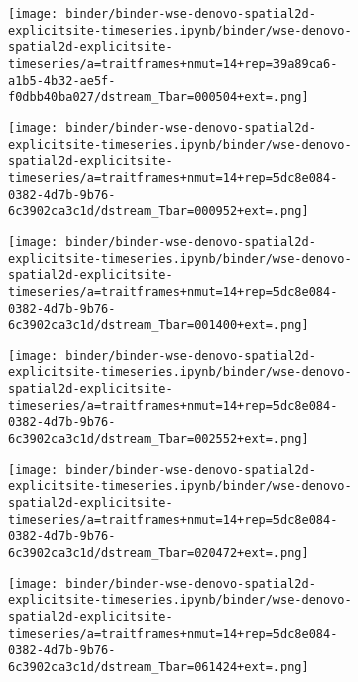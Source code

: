 \begin{figure}[ht]
  \centering
  \begin{subfigure}[t]{\textwidth}
    \centering
    \begin{minipage}[b]{0.04\textwidth}
      \caption{}
      \label{fig:dynamics:no-fixation}
    \end{minipage}
    \begin{minipage}[b]{0.15\textwidth}
      \texttt{[image: binder/binder-wse-denovo-spatial2d-explicitsite-timeseries.ipynb/binder/wse-denovo-spatial2d-explicitsite-timeseries/a=traitframes+nmut=14+rep=39a89ca6-a1b5-4b32-ae5f-f0dbb40ba027/dstream\_Tbar=000504+ext=.png]}
    \end{minipage}
    \begin{minipage}[b]{0.15\textwidth}
      \texttt{[image: binder/binder-wse-denovo-spatial2d-explicitsite-timeseries.ipynb/binder/wse-denovo-spatial2d-explicitsite-timeseries/a=traitframes+nmut=14+rep=5dc8e084-0382-4d7b-9b76-6c3902ca3c1d/dstream\_Tbar=000952+ext=.png]}
    \end{minipage}
    \begin{minipage}[b]{0.15\textwidth}
      \texttt{[image: binder/binder-wse-denovo-spatial2d-explicitsite-timeseries.ipynb/binder/wse-denovo-spatial2d-explicitsite-timeseries/a=traitframes+nmut=14+rep=5dc8e084-0382-4d7b-9b76-6c3902ca3c1d/dstream\_Tbar=001400+ext=.png]}
    \end{minipage}
    \begin{minipage}[b]{0.15\textwidth}
      \texttt{[image: binder/binder-wse-denovo-spatial2d-explicitsite-timeseries.ipynb/binder/wse-denovo-spatial2d-explicitsite-timeseries/a=traitframes+nmut=14+rep=5dc8e084-0382-4d7b-9b76-6c3902ca3c1d/dstream\_Tbar=002552+ext=.png]}
    \end{minipage}
    \begin{minipage}[b]{0.15\textwidth}
      \texttt{[image: binder/binder-wse-denovo-spatial2d-explicitsite-timeseries.ipynb/binder/wse-denovo-spatial2d-explicitsite-timeseries/a=traitframes+nmut=14+rep=5dc8e084-0382-4d7b-9b76-6c3902ca3c1d/dstream\_Tbar=020472+ext=.png]}
    \end{minipage}
    \begin{minipage}[b]{0.15\textwidth}
      \texttt{[image: binder/binder-wse-denovo-spatial2d-explicitsite-timeseries.ipynb/binder/wse-denovo-spatial2d-explicitsite-timeseries/a=traitframes+nmut=14+rep=5dc8e084-0382-4d7b-9b76-6c3902ca3c1d/dstream\_Tbar=061424+ext=.png]}
    \end{minipage}
  \end{subfigure}


\end{figure}
